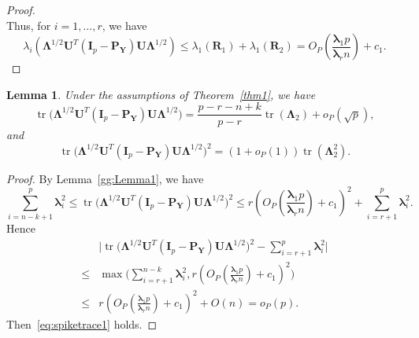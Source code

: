\documentclass[12pt]{article} %
\DeclareMathOperator{\mytr}{tr}
\newcommand{\bP}{\mathbf{P}}
\newcommand{\bY}{\mathbf{Y}}
\newcommand{\bR}{\mathbf{R}}
\newcommand{\bI}{\mathbf{I}}
\newcommand{\bU}{\mathbf{U}}
\newcommand{\bfsym}[1]{\ensuremath{\boldsymbol{#1}}}
\def\blambda {\bfsym {\lambda}}
\def\bLambda {\bfsym {\Lambda}}
\newtheorem{lemma}{Lemma}
\theoremstyle{definition}
\begin{document}
\begin{appendices}
\begin{proof}
$$$$
Thus, for $i=1,\ldots, r$, we have
    $$\lambda_i(\bLambda^{1/2}\bU^T (\bI_p-\bP_{\bY})\bU\bLambda^{1/2})
        \leq \lambda_1(\bR_1)+\lambda_1(\bR_2)= O_P(\frac{\blambda_1 p}{\blambda_r n}) + c_1.
    $$
\end{proof}
\begin{lemma}\label{gg:Lemma2}
    Under the assumptions of Theorem~\ref{thm1}, we have
    \begin{equation}\label{eq:spiketrace2}
        \mytr\big(\bLambda^{1/2} \bU^T (\bI_p-\bP_{\bY})\bU \bLambda^{1/2}\big)
= \frac{p-r-n+k}{p-r}\mytr(\bLambda_2)+o_P(\sqrt{p}),
\end{equation}
and
    \begin{equation}\label{eq:spiketrace1}
    \mytr\big(\bLambda^{1/2} \bU^T (\bI_p-\bP_{\bY})\bU \bLambda^{1/2}\big)^2 
 =(1+o_P(1))\mytr(\bLambda_2^2).
    \end{equation}
\end{lemma}
\begin{proof}
    By Lemma~\ref{gg:Lemma1}, we have
$$
    \sum_{i=n-k+1}^p \blambda_i^2\leq \mytr\big(\bLambda^{1/2} \bU^T (\bI_p-\bP_{\bY})\bU \bLambda^{1/2}\big)^2 \leq  r(O_P(\frac{\blambda_1 p}{\blambda_r n})+c_1)^2+\sum_{i=r+1}^p \blambda_i^2.
$$
    Hence
    \begin{equation*}
        \begin{aligned}
        &\big|\mytr\big(\bLambda^{1/2} \bU^T (\bI_p-\bP_{\bY})\bU \bLambda^{1/2}\big)^2 - \sum_{i=r+1}^p \blambda_i^2 \big|\\
        \leq &
            \max\Big(\sum_{i=r+1}^{n-k} \blambda_i^2 , r(O_P(\frac{\blambda_1 p}{\blambda_r n})+c_1)^2\Big)\\
        \leq &
            r(O_P(\frac{\blambda_1 p}{\blambda_r n})+c_1)^2+O(n)=o_P(p).
        \end{aligned}
    \end{equation*}
    Then~\eqref{eq:spiketrace1} holds.


\end{proof}
\end{appendices}
\end{document}
